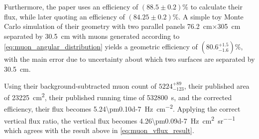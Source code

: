 \documentclass[herrin-thesis.tex]{subfiles}
\begin{document}
Furthermore, the paper uses an efficiency of \((88.5\pm0.2)\%\) to calculate their flux, while later quoting an efficiency of \((84.25\pm0.2)\%\). A simple toy Monte Carlo simulation of their geometry with two parallel panels \SI{76.2}{\cm}\(\times\)\SI{305}{\cm} separated by \SI{30.5}{\cm} with muons generated according to \cref{eq:muon_angular_distribution} yields a geometric efficiency of \((80.6^{+1.5}_{-1.6})\%\), with the main error due to uncertainty about which two surfaces are separated by \SI{30.5}{\cm}.

Using their background-subtracted muon count of \(5224^{+89}_{-123}\), their published area of \SI{23225}{\square\cm}, their published running time of \SI{532800}{s}, and the corrected efficiency, their flux becomes \SI{5.24\pm0.10d-7}{\Hz\per\square\cm}. Applying the correct vertical flux ratio, the vertical flux becomes \SI{4.26\pm0.09d-7}{\Hz\per\square\cm\per\steradian} which agrees with the result above in \cref{eq:muon_vflux_result}.

%
%
\end{document}
